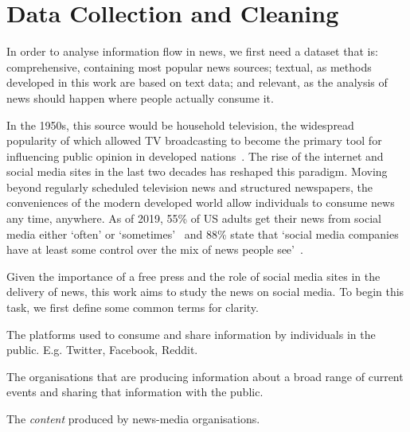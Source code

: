 \chapter{Data Collection and Cleaning}\label{ch:data}


In order to analyse information flow in news, we first need a dataset that is: comprehensive, containing most popular news sources; textual, as methods developed in this work are based on text data; and relevant, as the analysis of news should happen where people actually consume it.

In the 1950s, this source would be household television, the widespread popularity of which allowed TV broadcasting to become the primary tool for influencing public opinion in developed nations~\cite{abramson_electronic_1990}. 
The rise of the internet and social media sites in the last two decades has reshaped this paradigm. Moving beyond regularly scheduled television news and structured newspapers, the conveniences of the modern developed world allow individuals to consume news any time, anywhere. As of 2019, 55\% of US adults get their news from social media either `often' or `sometimes'~ and 88\% state that `social media companies have at least some control over the mix of news people see'~\cite{shearer_americans_2019}.

Given the importance of a free press and the role of social media sites in the delivery of news, this work aims to study the news on social media. To begin this task, we first define some common terms for clarity.

\begin{definition}
	The platforms used to consume and share information by individuals in the public. E.g. Twitter, Facebook, Reddit.
\end{definition}

\begin{definition}
	The organisations that are producing information about a broad range of current events and sharing that information with the public.
\end{definition}

\begin{definition}[News]
	The \emph{content} produced by news-media organisations. 
\end{definition}


